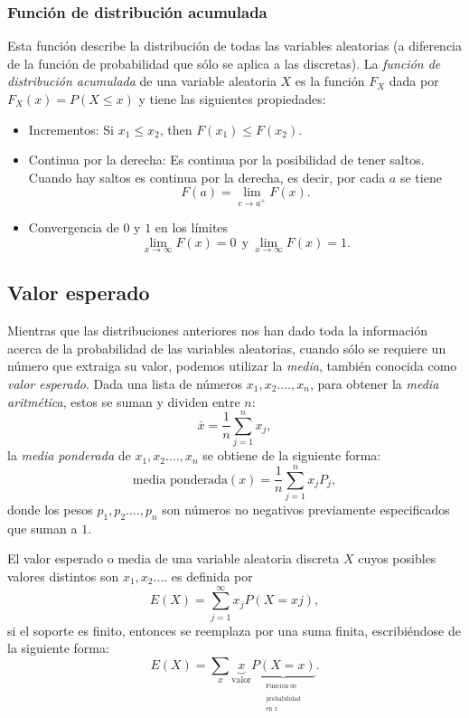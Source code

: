 \documentclass[letterpaper]{article}
\begin{document}
\subsubsection {Función de distribución acumulada}
Esta función describe la distribución de todas las variables aleatorias (a diferencia de la función de probabilidad que sólo se aplica a las discretas). La \emph{función de distribución acumulada} de una variable aleatoria $X$ es la función $F_X$ dada por $F_X(x)=P(X\leq x)$ y tiene las siguientes propiedades:
\begin{itemize}
    \item Incrementos: Si $x_1\leq x_2$, then $F(x_1)\leq F(x_2)$.
    \item Continua por la derecha: Es continua por la posibilidad de tener saltos. Cuando hay saltos es continua por la derecha, es decir, por cada $a$ se tiene
    \begin{equation}
    F(a)=\lim_{c\to a^+}F(x).
    \end{equation}
    \item Convergencia de $0$ y $1$ en los límites
    \begin{equation}
    \lim_{x\to \infty}F(x)=0\ \ \text{y}\ \lim_{x\to \infty}F(x)=1.
    \end{equation}
\end{itemize}
\subsection {Valor esperado}
Mientras que las distribuciones anteriores nos han dado toda la información acerca de la probabilidad de las variables aleatorias, cuando sólo se requiere un número que extraiga su valor, podemos utilizar la \emph{media}, también conocida como \emph{valor esperado}. Dada una lista de números $x_1,x_2.\ldots,x_n$, para obtener la \emph{media aritmética}, estos se suman y dividen entre $n$:
\begin{equation}
\bar{x}=\frac{1}{n}\sum_{j=1}^{n}x_j,
\end{equation}
la \emph{media ponderada} de $x_1,x_2.\ldots,x_n$ se obtiene de la siguiente forma:
\begin{equation}
\text{media ponderada}(x)=\frac{1}{n}\sum_{j=1}^{n}x_jP_j,
\end{equation}
donde los pesos $p_1,p_2.\ldots,p_n$ son números no negativos previamente especificados que suman a $1$.

El valor esperado o media de una variable aleatoria discreta $X$ cuyos posibles valores distintos son $x_1,x_2.\ldots$ es definida por
\begin{equation}
E(X)=\sum_{j=1}^{\infty}x_jP(X=xj),
\end{equation}
si el soporte es finito, entonces se reemplaza por una suma finita, escribiéndose de la siguiente forma:
\begin{equation}
E(X)=\sum_{x}\underbrace{x}_\text{valor}\underbrace{P(X=x)}_{\begin{matrix}^\text{Función de}\\^\text{probabilidad}\\^\text{en $x$}\end{matrix}}.
\end{equation}
\end{document}
